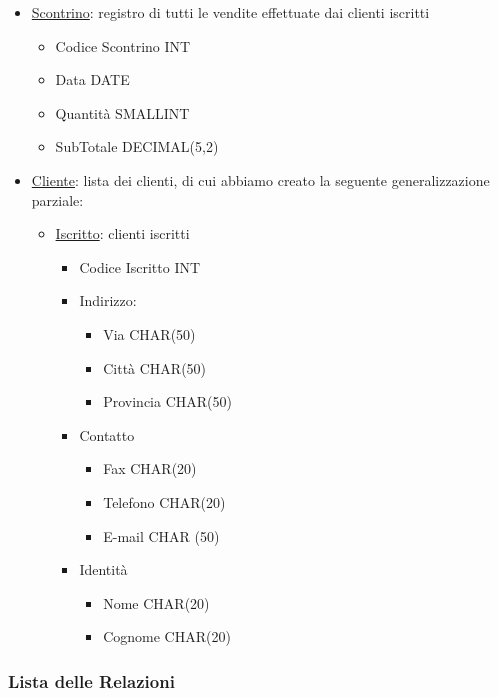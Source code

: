 \begin{itemize}
\item \underline{Scontrino}: registro di tutti le vendite effettuate dai clienti iscritti
  \begin{itemize}
  \item Codice Scontrino INT
  \item Data DATE
  \item Quantit\`a SMALLINT
  \item SubTotale DECIMAL(5,2)
  \end{itemize}

\item \underline{Cliente}: lista dei clienti, di cui abbiamo creato la seguente generalizzazione parziale:
  \begin{itemize}
  \item \underline{Iscritto}: clienti iscritti
    \begin{itemize}
    \item Codice Iscritto INT
    \item Indirizzo:
      \begin{itemize}
      \item Via CHAR(50)
      \item Citt\`a CHAR(50)
      \item Provincia CHAR(50)
      \end{itemize}

    \item Contatto
      \begin{itemize}
      \item Fax CHAR(20)
      \item Telefono CHAR(20)
      \item E-mail CHAR (50)
      \end{itemize}

    \item Identit\`a
      \begin{itemize}
      \item Nome CHAR(20)
      \item Cognome CHAR(20)
      \end{itemize}

    \end{itemize}
  \end{itemize}
  
\end{itemize}


\subsubsection{Lista delle Relazioni}

